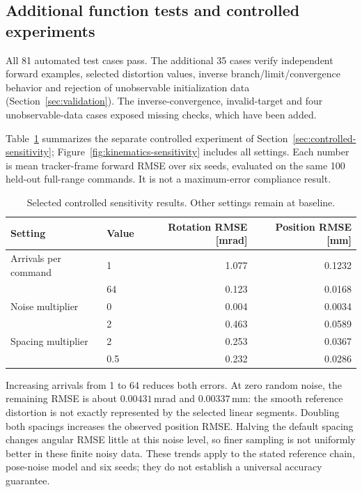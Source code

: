 \documentclass[../main.tex]{subfiles}
\begin{document}
\subsection{Additional function tests and controlled experiments}\label{sec:res-controlled}
All 81 automated test cases pass. The additional 35 cases verify independent forward examples, selected distortion values, inverse branch/limit/convergence behavior and rejection of unobservable initialization data (Section~\ref{sec:validation}). The inverse-convergence, invalid-target and four unobservable-data cases exposed missing checks, which have been added.

Table~\ref{tab:controlled-results} summarizes the separate controlled experiment of Section~\ref{sec:controlled-sensitivity}; Figure~\ref{fig:kinematics-sensitivity} includes all settings. Each number is mean tracker-frame forward RMSE over six seeds, evaluated on the same 100 held-out full-range commands. It is not a maximum-error compliance result.
\begin{table}[H]
\centering\small
\caption{Selected controlled sensitivity results. Other settings remain at baseline.}\label{tab:controlled-results}
\begin{tabular}{@{}llrr@{}}
\toprule
Setting & Value & Rotation RMSE [mrad] & Position RMSE [mm] \\\midrule
Arrivals per command & 1 & 1.077 & 0.1232 \\
 & 64 & 0.123 & 0.0168 \\
Noise multiplier & 0 & 0.004 & 0.0034 \\
 & 2 & 0.463 & 0.0589 \\
Spacing multiplier & 2 & 0.253 & 0.0367 \\
 & 0.5 & 0.232 & 0.0286 \\
\bottomrule
\end{tabular}
\end{table}
Increasing arrivals from 1 to 64 reduces both errors. At zero random noise, the remaining RMSE is about $0.00431$\,mrad and $0.00337$\,mm: the smooth reference distortion is not exactly represented by the selected linear segments. Doubling both spacings increases the observed position RMSE. Halving the default spacing changes angular RMSE little at this noise level, so finer sampling is not uniformly better in these finite noisy data. These trends apply to the stated reference chain, pose-noise model and six seeds; they do not establish a universal accuracy guarantee.
\end{document}
